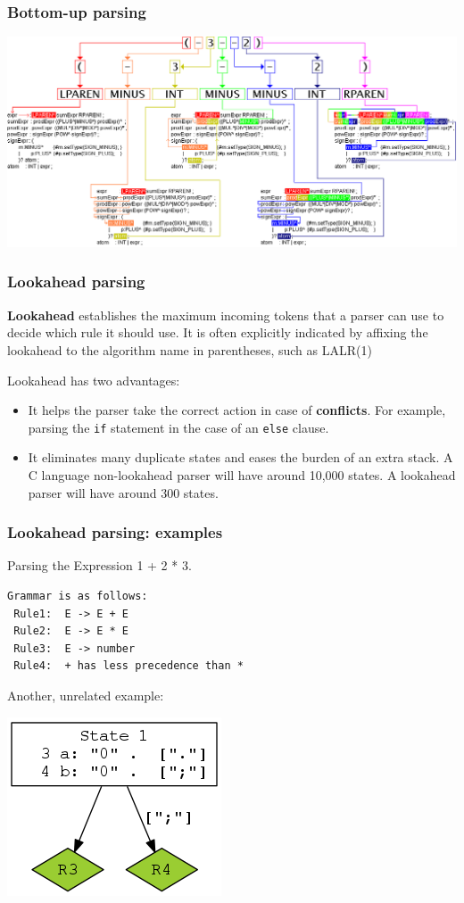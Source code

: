 \documentclass{beamer}
\begin{document}
\begin{frame}
  \frametitle{Bottom-up parsing}
  \begin{center}
    \includegraphics[scale=0.3]{sillyastthing}
  \end{center}
\end{frame}

\begin{frame}
  \frametitle{Lookahead parsing}
  \textbf{Lookahead} establishes the maximum incoming tokens that a parser can
  use to decide which rule it should use.  It is often explicitly indicated by
  affixing the lookahead to the algorithm name in parentheses, such as LALR(1)

  \vfill

Lookahead has two advantages:
\begin{itemize}
  \item It helps the parser take the correct action in case of
    \textbf{conflicts}. For example, parsing the \texttt{if} statement in the
    case of an \texttt{else} clause.

  \item It eliminates many duplicate states and eases the burden of an extra
    stack. A C language non-lookahead parser will have around 10,000 states. A
    lookahead parser will have around 300 states.
\end{itemize}
\end{frame}

\begin{frame}[fragile]
  \frametitle{Lookahead parsing: examples}
  Parsing the Expression 1 + 2 * 3.
  \vfill
\begin{verbatim}
Grammar is as follows:
 Rule1:  E -> E + E
 Rule2:  E -> E * E
 Rule3:  E -> number
 Rule4:  + has less precedence than *
\end{verbatim}
  \vfill
Another, unrelated example:
  \vfill
  \begin{center}
    \includegraphics[scale=0.4]{example-reduce}
  \end{center}
\end{frame}
\end{document}
